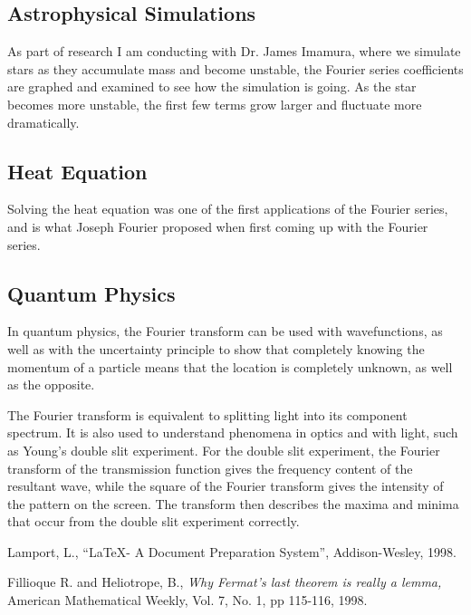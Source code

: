 \documentclass{article}
\begin{document}
\subsection{Astrophysical Simulations}
As part of research I am conducting with Dr. James Imamura, where we simulate stars as they accumulate mass and become unstable, the Fourier series coefficients are graphed and examined to see how the simulation is going. As the star becomes more unstable, the first few terms grow larger and fluctuate more dramatically.
\subsection{Heat Equation}
Solving the heat equation was one of the first applications of the Fourier series, and is what Joseph Fourier proposed when first coming up with the Fourier series.

\subsection{Quantum Physics}
In quantum physics, the Fourier transform can be used with wavefunctions, as well as with the uncertainty principle to show that completely knowing the momentum of a particle means that the location is completely unknown, as well as the opposite. 

The Fourier transform is equivalent to splitting light into its component spectrum. It is also used to understand phenomena in optics and with light, such as Young's double slit experiment. For the double slit experiment, the Fourier transform of the transmission function gives the frequency content of the resultant wave, while the square of the Fourier transform gives the intensity of the pattern on the screen. The transform then describes the maxima and minima that occur from the double slit experiment correctly.

\begin{thebibliography}{9}
         {\sc Lamport, L.,}
         ``\LaTeX - A Document Preparation System'',
         Addison-Wesley, 1998.

         {\sc Fillioque R.} and {\sc Heliotrope, B.,}
         {\em Why Fermat's last theorem is really a lemma,}
         American Mathematical Weekly,
         Vol. 7, No. 1, pp 115-116, 1998.

\end{thebibliography}
\end{document}
